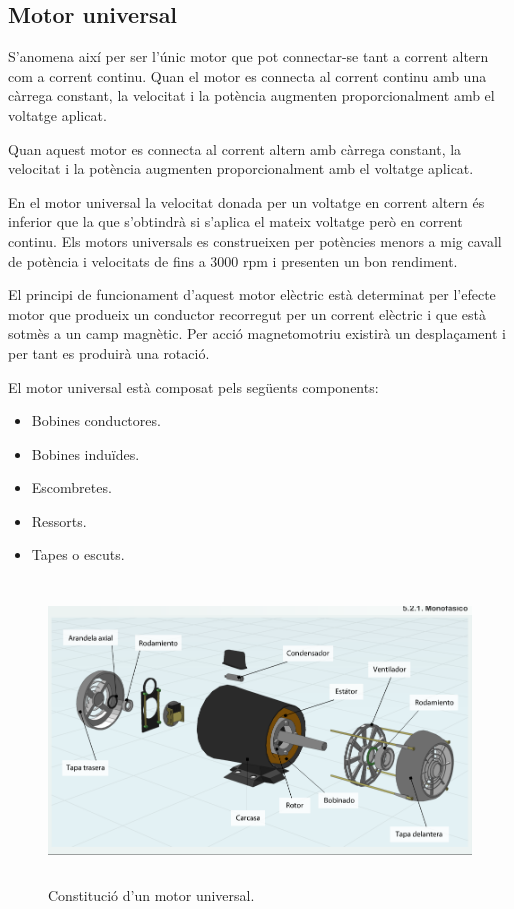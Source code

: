 \subsection{Motor universal}
S'anomena així per ser l'únic motor que pot connectar-se tant a corrent altern com a corrent continu. Quan el motor es connecta al corrent continu amb una càrrega constant, la velocitat i la potència augmenten proporcionalment amb el voltatge aplicat.

Quan aquest motor es connecta al corrent altern amb càrrega constant, la velocitat i la potència augmenten proporcionalment amb el voltatge aplicat.

En el motor universal la velocitat donada per un voltatge en corrent altern és inferior que la que s'obtindrà si s'aplica el mateix voltatge però en corrent continu. Els motors universals es construeixen per potències menors a mig cavall de potència i velocitats de fins a 3000 rpm i presenten un bon rendiment.

El principi de funcionament d'aquest motor elèctric està determinat per l'efecte motor que produeix un conductor recorregut per un corrent \newline elèctric i que està sotmès a un camp magnètic. Per acció magnetomotriu existirà un desplaçament i per tant es produirà una rotació.

El motor universal està composat pels següents components:
\begin{itemize}
    \item Bobines conductores.
    \item Bobines induïdes.
    \item Escombretes.
    \item Ressorts.
    \item Tapes o escuts.
\end{itemize}

\begin{figure}[H]
		\centering
    	\includegraphics[width=\textwidth,height=8cm]{Motors/composicionmotoruniversal.png}
     	\caption{Constitució d'un motor universal.} 
\end{figure}

